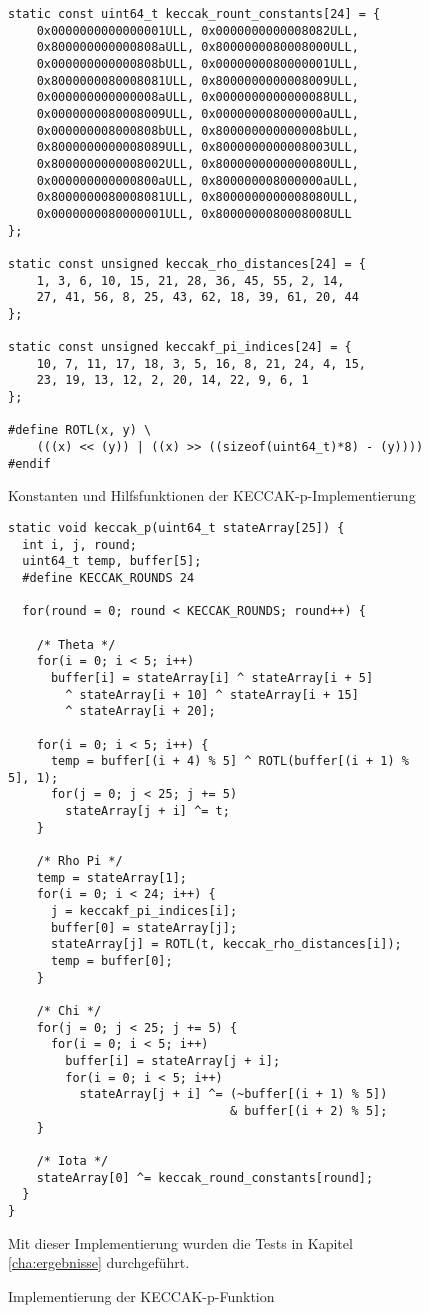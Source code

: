 \begin{figure}
\lstset{language=C}
\begin{lstlisting}[label={lst:keccak_impl_utils}]
static const uint64_t keccak_rount_constants[24] = {
    0x0000000000000001ULL, 0x0000000000008082ULL,
    0x800000000000808aULL, 0x8000000080008000ULL,
    0x000000000000808bULL, 0x0000000080000001ULL,
    0x8000000080008081ULL, 0x8000000000008009ULL,
    0x000000000000008aULL, 0x0000000000000088ULL,
    0x0000000080008009ULL, 0x000000008000000aULL,
    0x000000008000808bULL, 0x800000000000008bULL,
    0x8000000000008089ULL, 0x8000000000008003ULL,
    0x8000000000008002ULL, 0x8000000000000080ULL,
    0x000000000000800aULL, 0x800000008000000aULL,
    0x8000000080008081ULL, 0x8000000000008080ULL,
    0x0000000080000001ULL, 0x8000000080008008ULL
};

static const unsigned keccak_rho_distances[24] = {
    1, 3, 6, 10, 15, 21, 28, 36, 45, 55, 2, 14,
	27, 41, 56, 8, 25, 43, 62, 18, 39, 61, 20, 44
};

static const unsigned keccakf_pi_indices[24] = {
    10, 7, 11, 17, 18, 3, 5, 16, 8, 21, 24, 4, 15,
	23, 19, 13, 12, 2, 20, 14, 22, 9, 6, 1
};

#define ROTL(x, y) \
	(((x) << (y)) | ((x) >> ((sizeof(uint64_t)*8) - (y))))
#endif
\end{lstlisting}
\caption{Konstanten und Hilfsfunktionen der KECCAK-p-Implementierung}
\label{fig:keccak_impl_utils}
\end{figure}


\begin{figure}
\lstset{language=C}
\begin{lstlisting}[label={lst:keccak_impl}]
static void keccak_p(uint64_t stateArray[25]) {
  int i, j, round;
  uint64_t temp, buffer[5];
  #define KECCAK_ROUNDS 24

  for(round = 0; round < KECCAK_ROUNDS; round++) {

    /* Theta */
    for(i = 0; i < 5; i++)
      buffer[i] = stateArray[i] ^ stateArray[i + 5]
	    ^ stateArray[i + 10] ^ stateArray[i + 15]
        ^ stateArray[i + 20];

    for(i = 0; i < 5; i++) {
      temp = buffer[(i + 4) % 5] ^ ROTL(buffer[(i + 1) % 5], 1);
      for(j = 0; j < 25; j += 5)
        stateArray[j + i] ^= t;
    }

    /* Rho Pi */
    temp = stateArray[1];
    for(i = 0; i < 24; i++) {
      j = keccakf_pi_indices[i];
      buffer[0] = stateArray[j];
      stateArray[j] = ROTL(t, keccak_rho_distances[i]);
      temp = buffer[0];
    }

    /* Chi */
    for(j = 0; j < 25; j += 5) {
      for(i = 0; i < 5; i++)
        buffer[i] = stateArray[j + i];
        for(i = 0; i < 5; i++)
          stateArray[j + i] ^= (~buffer[(i + 1) % 5])
                               & buffer[(i + 2) % 5];
    }

    /* Iota */
    stateArray[0] ^= keccak_round_constants[round];
  }
}
\end{lstlisting}
\centering
\caption{Implementierung der KECCAK-p-Funktion}
\small Mit dieser Implementierung wurden die Tests in Kapitel \ref{cha:ergebnisse} durchgeführt.
\label{fig:keccak_impl}
\end{figure}

